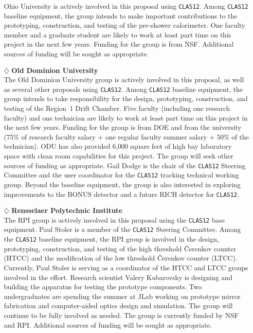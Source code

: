 \noindent
Ohio University is actively involved in this proposal using {\tt CLAS12}. 
Among {\tt CLAS12} baseline equipment, the group intends to make important 
contributions to the prototyping, construction, and testing of the pre-shower 
calorimeter.  One faculty member and a graduate student are likely to work 
at least part time on this project in the next few years.  Funding for the
group is from NSF.  Additional sources of funding will be sought as 
appropriate. 

\vskip 0.4cm

\noindent
$\diamondsuit$ {\bf Old Dominion University} \\[0.2ex]

\noindent
The Old Dominion University group is actively involved in this proposal, as 
well as several other proposals using {\tt CLAS12}.  Among {\tt CLAS12} 
baseline equipment, the group intends to take responsibility for the design, 
prototyping, construction, and testing of the Region~1 Drift Chamber. Five 
faculty (including one research faculty) and one technician are likely to 
work at least part time on this project in the next few years. Funding for 
the group is from DOE and from the university (75\% of research faculty 
salary + one regular faculty summer salary + 50\% of the technician).
ODU has also provided 6,000 square feet of high bay laboratory space with
clean room capabilities for this project.  The group will seek other sources 
of funding as appropriate.  Gail Dodge is the chair of the {\tt CLAS12} 
Steering Committee and the user coordinator for the {\tt CLAS12} tracking 
technical working group.  Beyond the baseline equipment, the group is also 
interested in exploring improvements to the BONUS detector and a future RICH 
detector for {\tt CLAS12}.

\vskip 0.4cm

\noindent
$\diamondsuit$ {\bf Rensselaer Polytechnic Institute} \\[0.2ex]

\noindent
The RPI group is actively involved in this proposal using the {\tt CLAS12} 
base equipment.  Paul Stoler is a member of the {\tt CLAS12} Steering 
Committee.  Among the {\tt CLAS12} baseline equipment, the RPI group is 
involved in the design, prototyping, construction, and testing of the high 
threshold {\v C}erenkov counter (HTCC) and the modification of the low 
threshold {\v C}erenkov counter (LTCC).  Currently, Paul Stoler is serving 
as a coordinator of the HTCC and LTCC groups involved in the effort. 
Research scientist Valery Kubarovsky is designing and building the apparatus 
for testing the prototype components.  Two undergraduates are spending the 
summer at JLab working on prototype mirror fabrication and computer-aided 
optics design and simulation.  The group will continue to be fully involved 
as needed. The group is currently funded by NSF and RPI. Additional sources 
of funding will be sought as appropriate.

